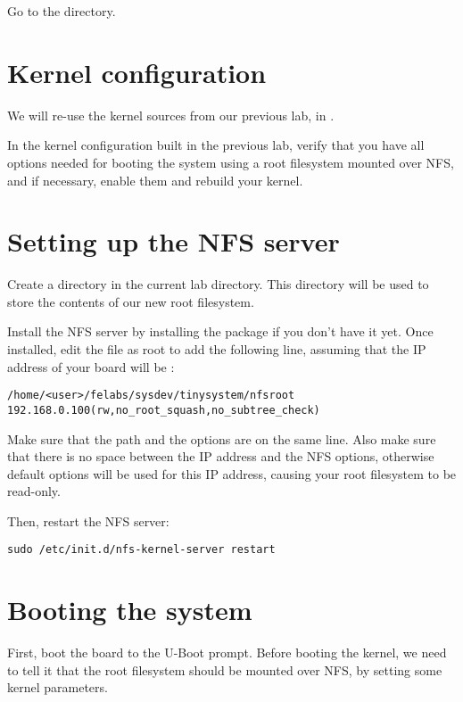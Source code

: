 Go to the  directory.

\section{Kernel configuration}

We will re-use the kernel sources from our previous lab, in
.

In the kernel configuration built in the previous lab, verify that you
have all options needed for booting the system using a root filesystem
mounted over NFS, and if necessary, enable them and rebuild your
kernel.

\section{Setting up the NFS server}

Create a  directory in the current lab directory. This
 directory will be used to store the contents of our new
root filesystem.

Install the NFS server by installing the 
package if you don't have it yet. Once installed, edit the
 file as root to add the following line, assuming that the
IP address of your board will be :

\footnotesize
\begin{verbatim}
/home/<user>/felabs/sysdev/tinysystem/nfsroot 192.168.0.100(rw,no_root_squash,no_subtree_check)
\end{verbatim}
\normalsize

Make sure that the path and the options are on the same line.
Also make sure that there is no space between the IP address and the NFS
options, otherwise default options will be used for this IP address,
causing your root filesystem to be read-only.

Then, restart the NFS server:

\begin{verbatim}
sudo /etc/init.d/nfs-kernel-server restart
\end{verbatim}

\section{Booting the system}

First, boot the board to the U-Boot prompt. Before booting the kernel,
we need to tell it that the root filesystem should be mounted over
NFS, by setting some kernel parameters.

